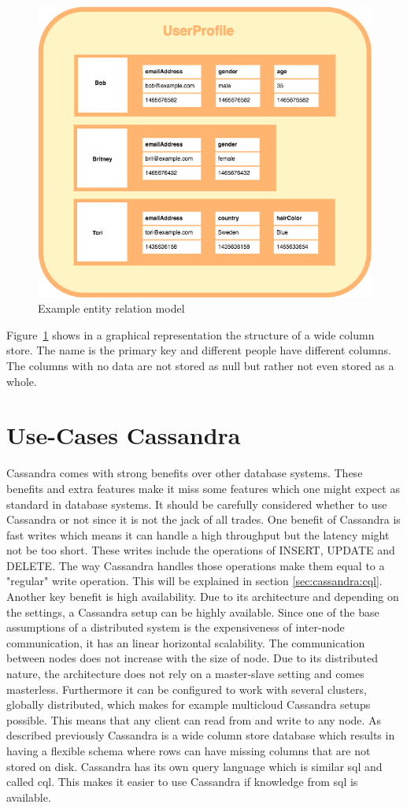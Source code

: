 \begin{figure}[ht]
    \centering
    \includegraphics[width=0.75\columnwidth]{img/wide_column_store.png}
    \caption{Example entity relation model \autocite{wideColumnGraphic}}
    \label{fig:cassandra:wide_column}
\end{figure}

Figure~\ref{fig:cassandra:wide_column} shows in a graphical representation the structure of a wide column store. The name is the primary key and different people have different columns. The columns with no data are not stored as null but rather not even stored as a whole.

\section{Use-Cases Cassandra}
Cassandra comes with strong benefits over other database systems. These benefits and extra features make it miss some features which one might expect as standard in database systems.
It should be carefully considered whether to use Cassandra or not since it is not the jack of all trades.
One benefit of Cassandra is fast writes which means it can handle a high throughput but the latency might not be too short. These writes include the operations of {INSERT}, {UPDATE} and {DELETE}.
The way Cassandra handles those operations make them equal to a "regular" write operation. This will be explained in section \ref{sec:cassandra:cql}. Another key benefit is high availability. Due to its architecture and depending on the settings, a Cassandra setup can be highly available. Since one of the base assumptions of a distributed system is the expensiveness of inter-node communication, it has an linear horizontal scalability.
The communication between nodes does not increase with the size of node. Due to its distributed nature, the architecture does not rely on a master-slave setting and comes masterless.
Furthermore it can be configured to work with several clusters, globally distributed, which makes for example multicloud Cassandra setups possible.
This means that any client can read from and write to any node. As described previously Cassandra is a wide column store database which results in having a flexible schema where rows can have missing columns that are not stored on disk.
Cassandra has its own query language which is similar \gls{sql} and called \gls{cql}. This makes it easier to use Cassandra if knowledge from \gls{sql} is available.

